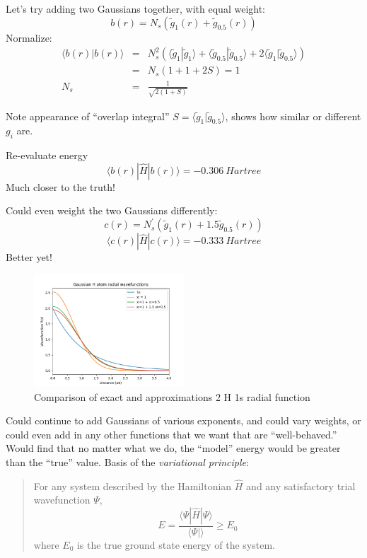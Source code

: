 \documentclass[11pt]{article}
\begin{document}
Let's try adding two Gaussians together, with equal weight:
\[b(r) = N_s \left(\tilde{g}_1(r) + \tilde{g}_{0.5}(r) \right )\]
Normalize:
\begin{eqnarray}
\langle b(r)|b(r)\rangle & = & N_s^2 \left(\langle\tilde{g}_1 | \tilde{g}_1\rangle + \langle\tilde{g}_{0.5} | \tilde{g}_{0.5}\rangle + 2\langle\tilde{g}_1 | \tilde{g}_{0.5}\rangle\right)\\
 &=& N_s(1+1 + 2 S) =1 \\
N_s &= &\frac{1}{\sqrt{2(1+S)}}
\end{eqnarray}

Note appearance of ``overlap integral'' \(S=\langle \tilde{g}_1|\tilde{g}_{0.5}\rangle\), shows how similar or different \(g_i\) are.

Re-evaluate energy
\[\langle b(r) |\hat{H} |b(r) \rangle = \SI{-0.306}{Hartree} \]
Much closer to the truth!  

Could even weight the two Gaussians differently:
\[c(r) = N_s^\prime \left(\tilde{g}_1(r) + 1.5 \tilde{g}_{0.5}(r) \right )\]
\[\langle c(r) |\hat{H} |c(r) \rangle = \SI{-0.333}{Hartree} \]
Better yet!

\begin{figure}[htbp]
\centering
\includegraphics[width=0.5\textwidth]{./Images/Hbasis.png}
\caption{Comparison of exact and approximations 2 H 1s radial function}
\end{figure}

Could continue to add Gaussians of various exponents, and could vary weights, or could
even add in any other functions that we want that are ``well-behaved.'' Would find that no
matter what we do, the ``model'' energy would be greater than the ``true'' value.  Basis of the \emph{variational principle}:

\begin{quote}
For any system described by the Hamiltonian \(\hat{H}\) and any satisfactory trial wavefunction \(\Psi\),
\[ E = \frac{\langle \Psi | \hat{H} | \Psi \rangle}{\langle \Psi | \rangle } \ge E_0\]
where \(E_0\) is the true ground state energy of the system.
\end{quote}
\end{document}
